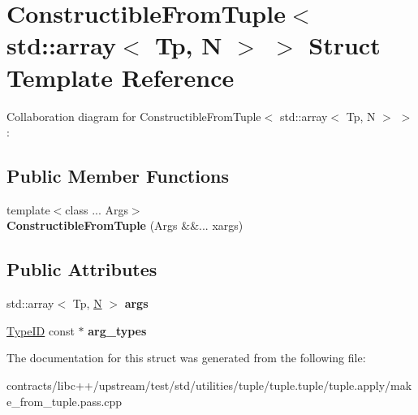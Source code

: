 \hypertarget{struct_constructible_from_tuple_3_01std_1_1array_3_01_tp_00_01_n_01_4_01_4}{}\section{Constructible\+From\+Tuple$<$ std\+:\+:array$<$ Tp, N $>$ $>$ Struct Template Reference}
\label{struct_constructible_from_tuple_3_01std_1_1array_3_01_tp_00_01_n_01_4_01_4}


Collaboration diagram for Constructible\+From\+Tuple$<$ std\+:\+:array$<$ Tp, N $>$ $>$\+:
\subsection*{Public Member Functions}
\begin{DoxyCompactItemize}
\item 
\mbox{\label{struct_constructible_from_tuple_3_01std_1_1array_3_01_tp_00_01_n_01_4_01_4_a73a2d673bd20f481ecf40432eb0ec68e}} 
{\footnotesize template$<$class ... Args$>$ }\\{\bfseries Constructible\+From\+Tuple} (Args \&\&... xargs)
\end{DoxyCompactItemize}
\subsection*{Public Attributes}
\begin{DoxyCompactItemize}
\item 
\mbox{\label{struct_constructible_from_tuple_3_01std_1_1array_3_01_tp_00_01_n_01_4_01_4_af1f3191251ad78b766c0023ca85da8ad}} 
std\+::array$<$ Tp, \mbox{\hyperlink{group__types_gaf9c1edb0e0da55ec6ba09f32f6839529}{N}} $>$ {\bfseries args}
\item 
\mbox{\label{struct_constructible_from_tuple_3_01std_1_1array_3_01_tp_00_01_n_01_4_01_4_a82981639b2bb801138940e3dd88c73ba}} 
\mbox{\hyperlink{struct_type_i_d}{Type\+ID}} const  $\ast$ {\bfseries arg\+\_\+types}
\end{DoxyCompactItemize}


The documentation for this struct was generated from the following file\+:\begin{DoxyCompactItemize}
\item 
contracts/libc++/upstream/test/std/utilities/tuple/tuple.\+tuple/tuple.\+apply/make\+\_\+from\+\_\+tuple.\+pass.\+cpp\end{DoxyCompactItemize}
